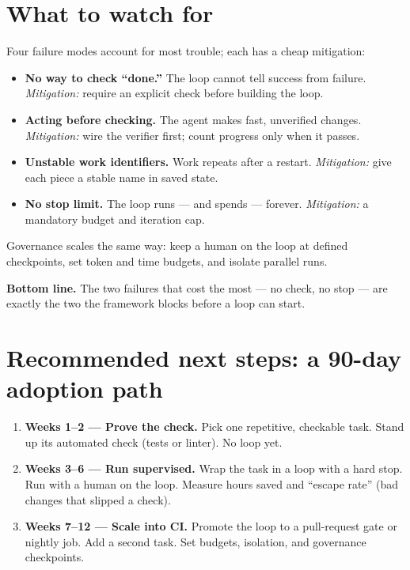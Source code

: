 \documentclass[11pt]{article}
\newcommand{\sotag}[1]{\textcolor{mckblue}{\textbf{#1}}}
\begin{document}
\section{What to watch for}
Four failure modes account for most trouble; each has a cheap mitigation:
\begin{itemize}
\item \sotag{No way to check ``done.''} The loop cannot tell success from
failure. \emph{Mitigation:} require an explicit check before building the loop.
\item \sotag{Acting before checking.} The agent makes fast, unverified changes.
\emph{Mitigation:} wire the verifier first; count progress only when it passes.
\item \sotag{Unstable work identifiers.} Work repeats after a restart.
\emph{Mitigation:} give each piece a stable name in saved state.
\item \sotag{No stop limit.} The loop runs --- and spends --- forever.
\emph{Mitigation:} a mandatory budget and iteration cap.
\end{itemize}
Governance scales the same way: keep a human on the loop at defined
checkpoints, set token and time budgets, and isolate parallel runs.

\begin{bottomline}
\textbf{Bottom line.} The two failures that cost the most --- no check, no stop ---
are exactly the two the framework blocks before a loop can start.
\end{bottomline}

\section{Recommended next steps: a 90-day adoption path}
\begin{enumerate}
\item \sotag{Weeks 1--2 --- Prove the check.} Pick one repetitive, checkable
task. Stand up its automated check (tests or linter). No loop yet.
\item \sotag{Weeks 3--6 --- Run supervised.} Wrap the task in a loop with a hard
stop. Run with a human on the loop. Measure hours saved and ``escape rate''
(bad changes that slipped a check).
\item \sotag{Weeks 7--12 --- Scale into CI.} Promote the loop to a pull-request
gate or nightly job. Add a second task. Set budgets, isolation, and governance
checkpoints.
\end{enumerate}
\end{document}
